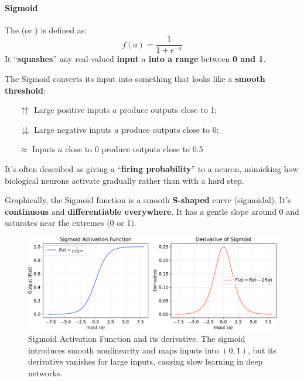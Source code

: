 \paragraph{Sigmoid}

The  (or ) is defined as:
\begin{equation}
    f(a) = \dfrac{1}{1 + e^{-a}}
\end{equation}
It ``\textbf{squashes}'' any real-valued \textbf{input} $a$ \textbf{into a range} between \textbf{0 and 1}.

\highspace
The Sigmoid converts its input into something that looks like a \textbf{smooth threshold}:
\begin{itemize}
    \item[\textcolor{Green3}{$\boldsymbol{\upuparrows}$}] Large positive inputs $a$ produce outputs close to 1;
    \item[\textcolor{Red2}{$\boldsymbol{\downdownarrows}$}] Large negative inputs $a$ produce outputs close to 0;
    \item[\textcolor{DarkOrange3}{$\boldsymbol{\approx}$}] Inputs $a$ close to 0 produce outputs close to 0.5
\end{itemize}
It's often described as giving a ``\textbf{firing probability}'' to a neuron, mimicking how biological neurons activate gradually rather than with a hard step.

\highspace
Graphically, the Sigmoid function is a smooth \textbf{S-shaped} curve (sigmoidal). It's \textbf{continuous} and \textbf{differentiable everywhere}. It has a gentle slope around $0$ and saturates near the extremes (0 or 1).

\begin{figure}[!htp]
    \centering
    \includegraphics[width=\textwidth]{img/fnns/sigmoid.pdf}
    \caption{Sigmoid Activation Function and its derivative. The sigmoid introduces smooth nonlinearity and maps inputs into $(0,1)$, but its derivative vanishes for large inputs, causing slow learning in deep networks.}
\end{figure}

